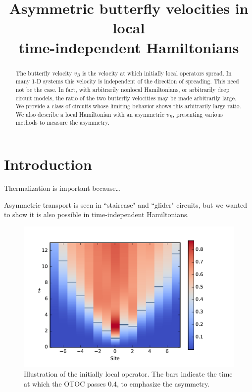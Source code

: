 \documentclass[aps,prl,reprint,superscriptaddress, longbibliography]{revtex4-1}
\begin{document}
\title{Asymmetric butterfly velocities in local\\ time-independent Hamiltonians
} 
%

\begin{abstract}
The butterfly velocity $v_B$ is the velocity at which initially local operators spread. In many 1-D systems this velocity is independent of the direction of spreading. This need not be the case. In fact, with arbitrarily nonlocal Hamiltonians, or arbitrarily deep circuit models, the ratio of the two butterfly velocities may be made arbitrarily large. We provide a class of circuits whose limiting behavior shows this arbitrarily large ratio. We also describe a local Hamiltonian with an asymmetric $v_B$, presenting various methods to measure the asymmetry.
\end{abstract}

\maketitle

\section{Introduction}

Thermalization is important because\dots

Asymmetric transport is seen in ``staircase" and ``glider" circuits, but we wanted to show it is also possible in time-independent Hamiltonians. 

\begin{figure}
	\includegraphics[width=\columnwidth]{colorplot}
	\caption{Illustration of the initially local operator. The bars indicate the time at which the OTOC passes 0.4, to emphasize the asymmetry.}
	\label{fig:colorplot}
\end{figure}
\end{document}
